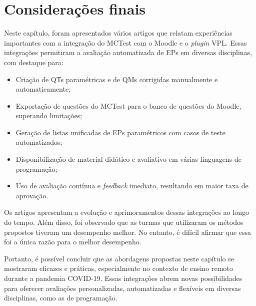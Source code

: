 \section{Considerações finais}

Neste capítulo, foram apresentados vários artigos que relatam experiências importantes com a integração do MCTest com o Moodle e o \textit{plugin} VPL. Essas integrações permitiram a avaliação automatizada de EPs em diversas disciplinas, com destaque para:

\begin{itemize}
    \item Criação de QTs paramétricas e de QMs corrigidas manualmente e automaticamente;
    \item Exportação de questões do MCTest para o banco de questões do Moodle, superando limitações;
    \item Geração de listas unificadas de EPs paramétricos com casos de teste automatizados;
    \item Disponibilização de material didático e avaliativo em várias linguagens de programação;
    \item Uso de avaliação contínua e \textit{feedback} imediato, resultando em maior taxa de aprovação.
\end{itemize}

Os artigos apresentam a evolução e aprimoramentos dessas integrações ao longo do tempo. Além disso, foi observado que as turmas que utilizaram os métodos propostos tiveram um desempenho melhor. No entanto, é difícil afirmar que essa foi a única razão para o melhor desempenho.

Portanto, é possível concluir que as abordagens propostas neste capítulo se mostraram eficazes e práticas, especialmente no contexto de ensino remoto durante a pandemia COVID-19. Essas integrações abrem novas possibilidades para oferecer avaliações personalizadas, automatizadas e flexíveis em diversas disciplinas, como as de programação.
